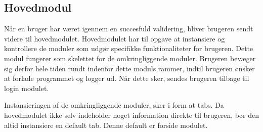 \subsection{Hovedmodul}
\label{sub:hovedmodul}

Når en bruger har været igennem en succesfuld validering, bliver brugeren sendt videre til hovedmodulet. Hovedmodulet har til opgave at instansiere og kontrollere de moduler som udgør specifikke funktionaliteter for brugeren. Dette modul fungerer som skelettet for de omkringliggende moduler. Brugeren bevæger sig derfor hele tiden rundt indenfor dette moduls rammer, indtil brugeren ønsker at forlade programmet og logger ud. Når dette sker, sendes brugeren tilbage til login modulet. 

Instansieringen af de omkringliggende moduler, sker i form at tabs. Da hovedmodulet ikke selv indeholder noget information direkte til brugeren, bør den altid instansiere en default tab. Denne default er forside modulet.

